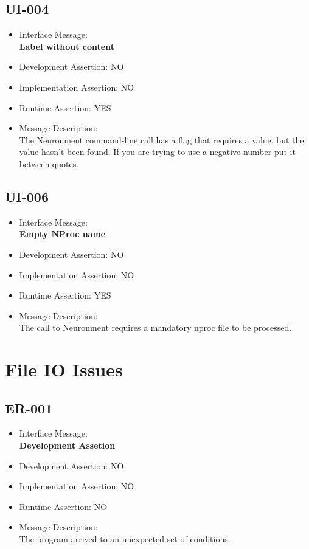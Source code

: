 \subsection{UI-004}
\begin{itemize}
  \item Interface Message:\\[1em]\textbf{Label without content}
  \item Development Assertion: NO
  \item Implementation Assertion: NO
  \item Runtime Assertion: YES
  \item Message Description:\\[1em]The Neuronment command-line call has a flag that requires a value, but the value hasn't been found. If you are trying to use a negative number put it between quotes.
\end{itemize}

\subsection{UI-006}
\begin{itemize}
  \item Interface Message:\\[1em]\textbf{Empty NProc name}
  \item Development Assertion: NO
  \item Implementation Assertion: NO
  \item Runtime Assertion: YES
  \item Message Description:\\[1em]The call to Neuronment requires a mandatory nproc file to be processed.
\end{itemize}

\section{File IO Issues}

\subsection{ER-001}
\begin{itemize}
  \item Interface Message:\\[1em]\textbf{Development Assetion}
  \item Development Assertion: NO
  \item Implementation Assertion: NO
  \item Runtime Assertion: NO
  \item Message Description:\\[1em]The program arrived to an unexpected set of conditions.
\end{itemize}

